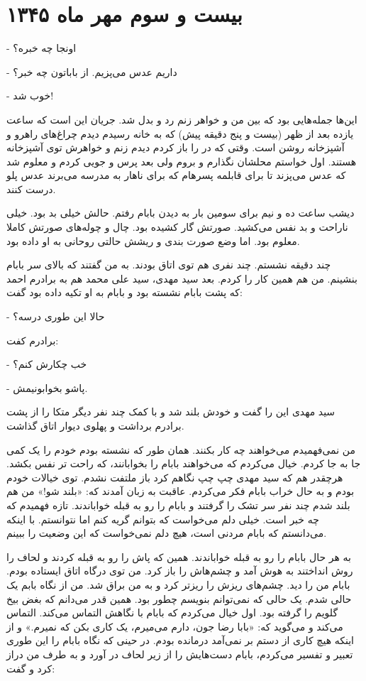 \documentclass[12pt,a4paper]{book}
\begin{document}
\chapter{بیست و سوم مهر ماه ۱۳۴۵}

- اونجا چه خبره؟

- داریم عدس می‌پزیم. از باباتون چه خبر؟

- خوب شد!

این‌ها جمله‌هایی بود که بین من و خواهر زنم رد و بدل شد. جریان این است که ساعت یازده بعد از ظهر (بیست و پنج دقیقه پیش) که به خانه رسیدم دیدم چراغ‌های راهرو و آشپزخانه روشن است. وقتی که در را باز کردم دیدم زنم و خواهرش توی آشپزخانه هستند. اول خواستم محلشان نگذارم و بروم ولی بعد پرس و جویی کردم و معلوم شد که عدس می‌پزند تا برای قابلمه پسرهام که برای ناهار به مدرسه می‌برند عدس پلو درست کنند.

دیشب ساعت ده و نیم برای سومین بار به دیدن بابام رفتم. حالش خیلی بد بود. خیلی ناراحت و بد نفس می‌کشید. صورتش گار کشیده بود. چال و چوله‌های صورتش کاملا معلوم بود. اما وضع صورت بندی و ریشش حالتی روحانی به او داده بود.

چند دقیقه نشستم. چند نفری هم توی اتاق بودند. به من گفتند که بالای سر بابام بنشینم. من هم همین کار را کردم. بعد سید مهدی، سید علی محمد هم به برادرم احمد که پشت بابام نشسته بود و بابام به او تکیه داده بود گفت:

- حالا این طوری درسه؟

برادرم کفت:

- خب چکارش کنم؟

- پاشو بخوابونیمش.

سید مهدی این را گفت و خودش بلند شد و با کمک چند نفر دیگر متکا را از پشت برادرم برداشت و پهلوی دیوار اتاق گذاشت.

من نمی‌فهمیدم می‌خواهند چه کار بکنند. همان طور که نشسته بودم خودم را یک کمی جا به جا کردم. خیال می‌کردم که می‌خواهند بابام را بخوابانند، که راحت تر نفس بکشد. هرچقدر هم که سید مهدی چپ چپ نگاهم کرد باز ملتفت نشدم. توی خیالات خودم بودم و به حال خراب بابام فکر می‌کردم. عاقبت به زبان آمدند که: «بلند شو!» من هم بلند شدم چند نفر سر تشک را گرفتند و بابام را رو به قبله خواباندند. تازه فهمیدم که چه خبر است. خیلی دلم می‌خواست که بتوانم گریه کنم اما نتوانستم. با اینکه می‌دانستم که بابام مردنی است، هیچ دلم نمی‌خواست که این وضعیت را ببینم.

به هر حال بابام را رو به قبله خواباندند. همین که پاش را رو به قبله کردند و لحاف را روش انداختند به هوش آمد و چشم‌هاش را باز کرد. من توی درگاه اتاق ایستاده بودم. بابام من را دید. چشم‌های ریزش را ریزتر کرد و به من براق شد. من از نگاه بابم یک حالی شدم. یک حالی که نمی‌توانم بنویسم چطور بود. همین قدر می‌دانم که بغض بیخ گلویم را گرفته بود. اول خیال می‌کردم که بابام با نگاهش التماس می‌کند. التماس می‌کند و می‌گوید که: «بابا رضا جون، دارم می‌میرم، یک کاری بکن که نمیرم.» و از اینکه هیچ کاری از دستم بر نمی‌آمد درمانده بودم. در حینی که نگاه بابام را این طوری تعبیر و تفسیر می‌کردم، بابام دست‌هایش را از زیر لحاف در آورد و به طرف من دراز کرد و گفت:
\end{document}
